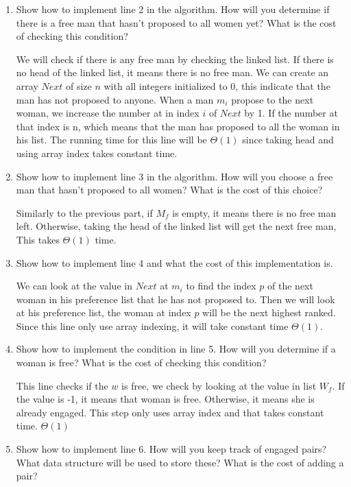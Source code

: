 \documentclass{cpsc413Solutions}
\begin{document}
\begin{problemlist}
\begin{problem}
\begin{answer}
\begin{enumerate}
    \item Show how to implement line 2 in the algorithm. How will you determine if there is a free man that hasn’t proposed to all women yet? What is the cost of checking this condition?
    
    We will check if there is any free man by checking the linked list. If there is no head of the linked list, it means there is no free man. We can create an array $Next$ of size $n$ with all integers initialized to 0, this indicate that the man has not proposed to anyone. When a man $m_i$ propose to the next woman, we increase the number at in index $i$ of $Next$ by 1. If the number at that index is n, which means that the man has proposed to all the woman in his list. The running time for this line will be $\Theta(1)$ since taking  head and using array index takes constant time.
    
    
    \item Show how to implement line 3 in the algorithm. How will you choose a free man that hasn’t proposed to all women? What is the cost of this choice?
    
    Similarly to the previous part, if $M_f$ is empty, it means there is no free man left. Otherwise, taking the head of the linked list will get the next free man, This takes $\Theta(1)$ time.
    
    \item Show how to implement line 4 and what the cost of this implementation is.
    
    We can look at the value in $Next$ at $m_i$ to find the index $p$ of the next woman in his preference list that he has not proposed to. Then we will look at his preference list, the woman at index $p$ will be the next highest ranked. Since this line only use array indexing, it will take constant time $\Theta(1)$.
    
    \item Show how to implement the condition in line 5. How will you determine if a woman is free? What is the cost of checking this condition? 
    
    This line checks if the $w$ is free, we check by looking at the value in list $W_f$. If the value is -1, it means that woman is free. Otherwise, it means she is already engaged. This step only uses array index and that takes constant time. $\Theta(1)$
    
    \item Show how to implement line 6. How will you keep track of engaged pairs? What data structure will be used to store these? What is the cost of adding a pair?
    

\end{enumerate}
\end{answer}
\end{problem}
\end{problemlist}
\end{document}
